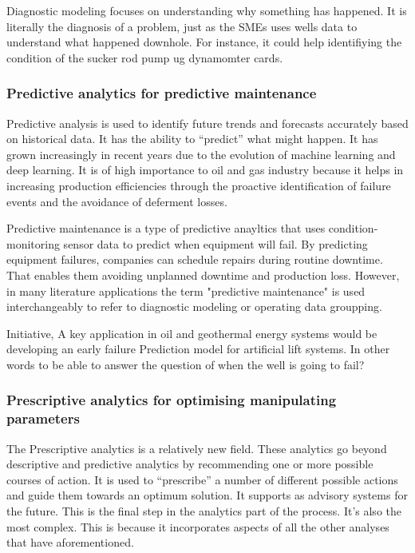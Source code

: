 Diagnostic modeling focuses on understanding why something has happened. It is literally the diagnosis of a problem, just as the \ac{SME}s uses wells data to understand what happened downhole. For instance, it could help identifiying the condition of the sucker rod pump ug dynamomter cards.

\subsubsection{Predictive analytics for predictive maintenance}
Predictive analysis is used to identify future trends and forecasts accurately based on historical data. It has the ability to “predict” what might happen.
It has grown increasingly in recent years due to the evolution of machine learning and deep learning. It is of high importance to oil and gas industry because it helps in increasing production efficiencies through the proactive identification of failure events and the avoidance of deferment losses.

Predictive maintenance is a type of predictive anayltics that uses condition-monitoring sensor data to predict when equipment will fail. By predicting equipment failures, companies can schedule repairs during routine downtime. That enables them avoiding unplanned downtime and production loss. However, in many literature applications the term "predictive maintenance" is used interchangeably to refer to diagnostic modeling or operating data groupping.

Initiative, A key application in oil and geothermal energy systems would be developing an early failure Prediction model for artificial lift systems. In other words to be able to answer the question of when the well is going to fail?

\subsubsection{Prescriptive analytics for optimising manipulating parameters}
The Prescriptive analytics is a relatively new field. These analytics go beyond descriptive and predictive analytics by recommending one or more possible courses of action. It is used to “prescribe” a number of different possible actions and guide them towards an optimum  solution. It supports as advisory systems for the future. This is the final step in the analytics part of the process. It’s also the most complex. This is because it incorporates aspects of all the other analyses that have aforementioned.

